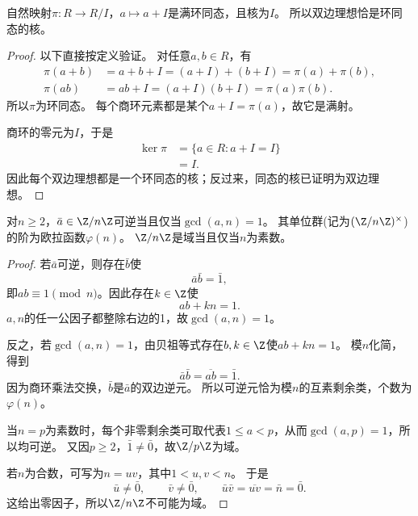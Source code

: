 \begin{proposition}
\label{p2:concept:c1-l1328}自然映射$\pi:R\to R/I$，$a\mapsto a+I$是满环同态，且核为$I$。
所以双边理想恰是环同态的核。
\end{proposition}
\begin{proof}
以下直接按定义验证。
对任意$a,b\in R$，有
\[
\begin{aligned}
\pi(a+b)&=a+b+I=(a+I)+(b+I)=\pi(a)+\pi(b),\\
\pi(ab)&=ab+I=(a+I)(b+I)=\pi(a)\pi(b).
\end{aligned}
\]
所以$\pi$为环同态。
每个商环元素都是某个$a+I=\pi(a)$，故它是满射。

商环的零元为$I$，于是
\[
\begin{aligned}
\ker\pi
&=\{a\in R:a+I=I\}\\
&=I.
\end{aligned}
\]
因此每个双边理想都是一个环同态的核；反过来，同态的核已证明为双边理想。
\end{proof}

\begin{proposition}
对$n\geq2$，$\bar a\in\Z/n\Z$可逆当且仅当$\gcd(a,n)=1$。
\label{p2:concept:c1-l1356}其单位群(记为$(\Z/n\Z)^{\times}$)的阶为欧拉函数$\varphi(n)$。
$\Z/n\Z$是域当且仅当$n$为素数。
\end{proposition}
\begin{proof}
若$\bar a$可逆，则存在$\bar b$使
\[
\bar a\bar b=\bar1,
\]
即$ab\equiv1\pmod n$。因此存在$k\in\Z$使
\[
ab+kn=1.
\]
$a,n$的任一公因子都整除右边的1，故$\gcd(a,n)=1$。

反之，若$\gcd(a,n)=1$，由贝祖等式存在$b,k\in\Z$使$ab+kn=1$。
模$n$化简，得到
\[
\bar a\bar b=\overline{ab}=\bar1.
\]
因为商环乘法交换，$\bar b$是$\bar a$的双边逆元。
所以可逆元恰为模$n$的互素剩余类，个数为$\varphi(n)$。

当$n=p$为素数时，每个非零剩余类可取代表$1\leq a<p$，从而$\gcd(a,p)=1$，所以均可逆。
又因$p\geq2$，$\bar1\neq\bar0$，故$\Z/p\Z$为域。

若$n$为合数，可写为$n=uv$，其中$1<u,v<n$。
于是
\[
\bar u\neq\bar0,\qquad \bar v\neq\bar0,
\qquad \bar u\bar v=\overline{uv}=\bar n=\bar0.
\]
这给出零因子，所以$\Z/n\Z$不可能为域。
\end{proof}

